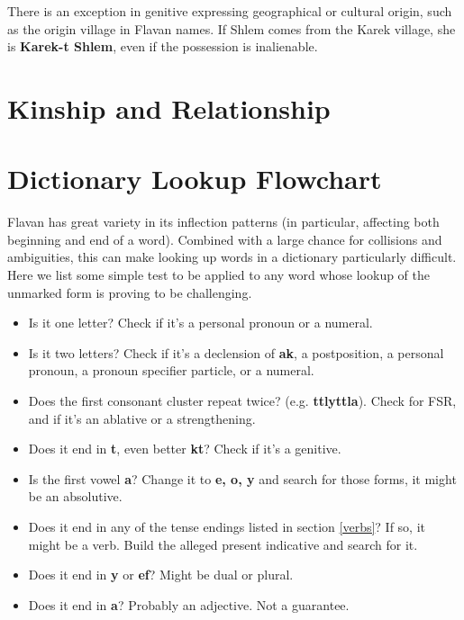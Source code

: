 \documentclass[10pt,oneside]{memoir}
\newcommand{\fsr}{FSR}
\begin{document}
There is an exception in genitive expressing geographical or cultural origin, such as the origin village in Flavan names. If Shlem comes from the Karek village, she is \textbf{Karek-t Shlem}, even if the possession is inalienable.



\section{Kinship and Relationship}



\pagebreak
\section{Dictionary Lookup Flowchart}

Flavan has great variety in its inflection patterns (in particular, affecting both beginning and end of a word). Combined with a large chance for collisions and ambiguities, this can make looking up words in a dictionary particularly difficult. Here we list some simple test to be applied to any word whose lookup of the unmarked form is proving to be challenging.

\begin{itemize}
    \item Is it one letter? Check if it's a personal pronoun or a numeral.
    \item Is it two letters? Check if it's a declension of \textbf{ak}, a postposition, a personal pronoun, a pronoun specifier particle, or a numeral.
    \item Does the first consonant cluster repeat twice? (e.g. \textbf{ttlyttla}). Check for \fsr , and if it's an ablative or a strengthening.
    \item Does it end in \textbf{t}, even better \textbf{kt}? Check if it's a genitive.
    \item Is the first vowel \textbf{a}? Change it to \textbf{e, o, y} and search for those forms, it might be an absolutive.
    \item Does it end in any of the tense endings listed in section \ref{verbs}? If so, it might be a verb. Build the alleged present indicative and search for it.
    \item Does it end in \textbf{y} or \textbf{ef}? Might be dual or plural.
    \item Does it end in \textbf{a}? Probably an adjective. Not a guarantee.
\end{itemize}
\end{document}
